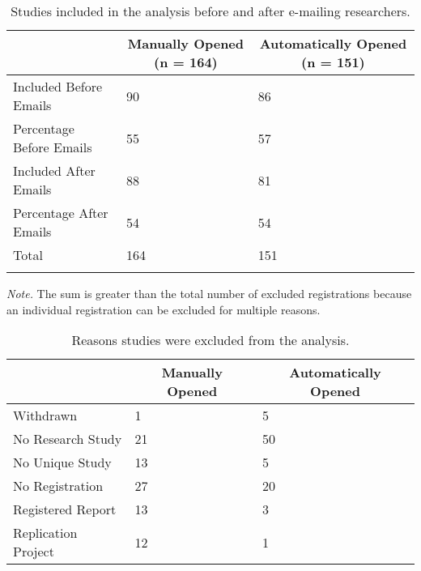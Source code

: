 \documentclass[
  ,jou, a4paper,floatsintext]{apa6}
\begin{document}
\begin{table*}[tbp]

\begin{center}
\begin{threeparttable}

\caption{\label{tab:table-included}Studies included in the analysis before and after e-mailing researchers.}

\begin{tabular}{lll}
\toprule
 & \multicolumn{1}{c}{Manually Opened (n = 164)} & \multicolumn{1}{c}{Automatically Opened (n = 151)}\\
\midrule
Included Before Emails & 90 & 86\\
Percentage Before Emails & 55 & 57\\
Included After Emails & 88 & 81\\
Percentage After Emails & 54 & 54\\
Total & 164 & 151\\
\bottomrule
\addlinespace
\end{tabular}

\begin{tablenotes}[para]
\normalsize{\textit{Note.} The sum is greater than the total number of excluded registrations because an individual registration can be excluded for multiple reasons.}
\end{tablenotes}

\end{threeparttable}
\end{center}

\end{table*}

\begin{table*}[tbp]

\begin{center}
\begin{threeparttable}

\caption{\label{tab:table-excluded}Reasons studies were excluded from the analysis.}

\begin{tabular}{lll}
\toprule
 & \multicolumn{1}{c}{Manually Opened} & \multicolumn{1}{c}{Automatically Opened}\\
\midrule
Withdrawn & 1 & 5\\
No Research Study & 21 & 50\\
No Unique Study & 13 & 5\\
No Registration & 27 & 20\\
Registered Report & 13 & 3\\
Replication Project & 12 & 1\\
\bottomrule
\end{tabular}

\end{threeparttable}
\end{center}

\end{table*}
\end{document}
